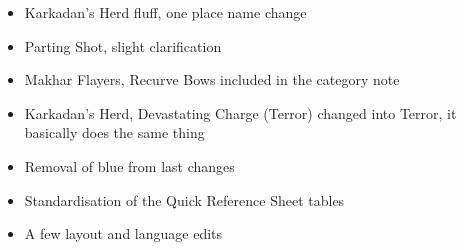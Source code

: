 

\subtitle{beta 2.2.2}

\begin{itemize}
\item Karkadan's Herd fluff, one place name change
\item Parting Shot, slight clarification
\item Makhar Flayers, Recurve Bows included in the category note
\end{itemize}

\subtitle{beta 2.2.1}

\begin{itemize}
\item Karkadan's Herd, Devastating Charge (Terror) changed into Terror, it basically does the same thing
\item Removal of blue from last changes
\item Standardisation of the Quick Reference Sheet tables
\item A few layout and language edits
\end{itemize}
